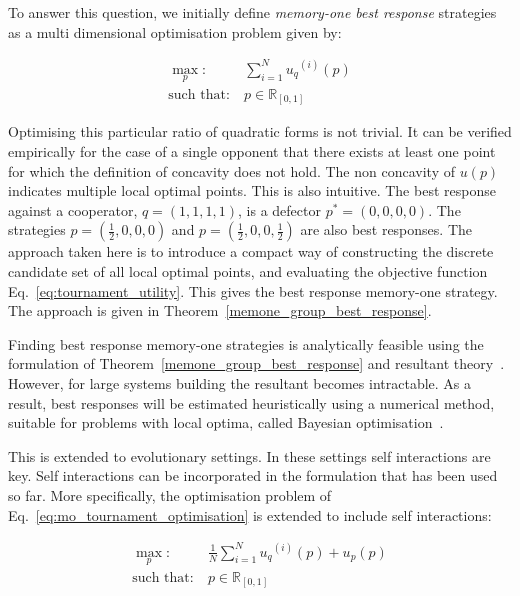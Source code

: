 \documentclass[10pt]{article}
\newcommand{\R}{\mathbb{R}}
\begin{document}
To answer this question, we initially define \textit{memory-one best response}
strategies as a multi dimensional optimisation problem given by:

\begin{equation}\label{eq:mo_tournament_optimisation}
    \begin{aligned}
    \max_p: & \ \sum_{i=1} ^ {N} {u_q}^{(i)} (p)
    \\
    \text{such that}: & \ p \in \R_{[0, 1]}
    \end{aligned}
\end{equation}

Optimising this particular ratio of quadratic forms is not trivial. It can be
verified empirically for the case of a single opponent that there exists at
least one point for which the definition of concavity does not hold.
The non concavity of \(u(p)\) indicates multiple local
optimal points. This is also intuitive. The best response against a cooperator,
\(q=(1, 1, 1, 1)\), is a defector \(p^*=(0, 0, 0, 0)\). The strategies
\(p=(\frac{1}{2}, 0, 0, 0)\) and \(p=(\frac{1}{2}, 0, 0, \frac{1}{2})\) are also
best responses. The approach taken here is to introduce a compact way of
constructing the discrete candidate set of all local optimal points, and evaluating
the objective function Eq.~\ref{eq:tournament_utility}. This gives the best
response memory-one strategy. The approach is given in
Theorem~\ref{memone_group_best_response}.

Finding best response memory-one strategies is analytically feasible using the
formulation of Theorem~\ref{memone_group_best_response} and resultant
theory~\cite{Jonsson2005}. However, for large systems building the resultant
becomes intractable. As a result, best responses will be estimated
heuristically using a numerical method, suitable for problems with local optima,
called Bayesian optimisation~\cite{Mokus1978}.

This is extended to evolutionary settings. In these settings
self interactions are key. Self interactions can be incorporated in the
formulation that has been used so far. More specifically, the optimisation
problem of Eq.~\ref{eq:mo_tournament_optimisation} is extended to include self
interactions:

\begin{equation}\label{eq:mo_evolutionary_optimisation}
\begin{aligned}
\max_p: & \ \frac{1}{N} \sum\limits_{i=1} ^ {N} {u_q}^{(i)} (p) + u_p(p)
\\
\text{such that}: & \ p \in \R_{[0, 1]}
\end{aligned}
\end{equation}
\end{document}
